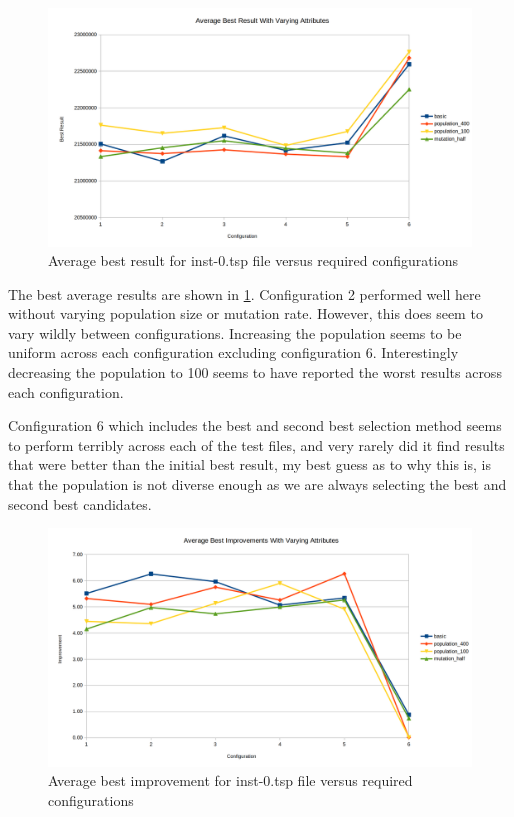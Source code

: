 \begin{figure}[H]
\vspace{-5pt}
\centering
\includegraphics[width=1.0\textwidth]{images/inst-0-average-best.png}
\caption{\label{fig:inst-0-average-best}Average best result for inst-0.tsp file versus required configurations}
\end{figure}

The best average results are shown in \ref{fig:inst-0-average-best}. Configuration 2 performed well here without varying population size or mutation rate. However, this does seem to vary wildly between configurations. Increasing the population seems to be uniform across each configuration excluding configuration 6. Interestingly decreasing the population to 100 seems to have reported the worst results across each configuration.

Configuration 6 which includes the best and second best selection method seems to perform terribly across each of the test files, and very rarely did it find results that were better than the initial best result, my best guess as to why this is, is that the population is not diverse enough as we are always selecting the best and second best candidates.

\begin{figure}[H]
\vspace{-5pt}
\centering
\includegraphics[width=1.0\textwidth]{images/inst-0-best-improvements.png}
\caption{\label{fig:inst-0-best-improvements}Average best improvement for inst-0.tsp file versus required configurations}
\end{figure}

